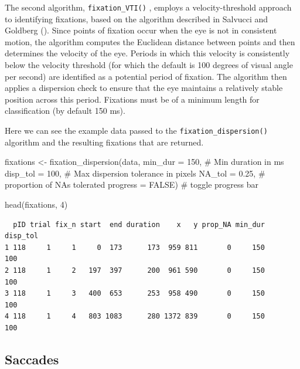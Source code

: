 \documentclass[
  man,
  floatsintext,
  longtable,
  nolmodern,
  notxfonts,
  notimes,
  colorlinks=true,linkcolor=blue,citecolor=blue,urlcolor=blue]{apa7}
\newenvironment{Shaded}{\begin{snugshade}}{\end{snugshade}}
\newcommand{\AttributeTok}[1]{\textcolor[rgb]{0.40,0.45,0.13}{#1}}
\newcommand{\CommentTok}[1]{\textcolor[rgb]{0.37,0.37,0.37}{#1}}
\newcommand{\ConstantTok}[1]{\textcolor[rgb]{0.56,0.35,0.01}{#1}}
\newcommand{\DecValTok}[1]{\textcolor[rgb]{0.68,0.00,0.00}{#1}}
\newcommand{\FloatTok}[1]{\textcolor[rgb]{0.68,0.00,0.00}{#1}}
\newcommand{\FunctionTok}[1]{\textcolor[rgb]{0.28,0.35,0.67}{#1}}
\newcommand{\NormalTok}[1]{\textcolor[rgb]{0.00,0.23,0.31}{#1}}
\newcommand{\OtherTok}[1]{\textcolor[rgb]{0.00,0.23,0.31}{#1}}
\begin{document}
The second algorithm, \texttt{fixation\_VTI()} , employs a
velocity-threshold approach to identifying fixations, based on the
algorithm described in Salvucci and Goldberg
(). Since points of fixation occur when
the eye is not in consistent motion, the algorithm computes the
Euclidean distance between points and then determines the velocity of
the eye. Periods in which this velocity is consistently below the
velocity threshold (for which the default is 100 degrees of visual angle
per second) are identified as a potential period of fixation. The
algorithm then applies a dispersion check to ensure that the eye
maintains a relatively stable position across this period. Fixations
must be of a minimum length for classification (by default 150 ms).

Here we can see the example data passed to the
\texttt{fixation\_dispersion()} algorithm and the resulting fixations
that are returned.

\begin{Shaded}
\begin{Highlighting}[]
\NormalTok{fixations }\OtherTok{\textless{}{-}} 
  \FunctionTok{fixation\_dispersion}\NormalTok{(data,}
                      \AttributeTok{min\_dur =} \DecValTok{150}\NormalTok{, }\CommentTok{\# Min duration in ms}
                      \AttributeTok{disp\_tol =} \DecValTok{100}\NormalTok{, }\CommentTok{\# Max dispersion tolerance in pixels}
                      \AttributeTok{NA\_tol =} \FloatTok{0.25}\NormalTok{, }\CommentTok{\# proportion of NAs tolerated }
                      \AttributeTok{progress =} \ConstantTok{FALSE}\NormalTok{) }\CommentTok{\# toggle progress bar}
                   

\FunctionTok{head}\NormalTok{(fixations, }\DecValTok{4}\NormalTok{)}
\end{Highlighting}
\end{Shaded}

\begin{verbatim}
  pID trial fix_n start  end duration    x   y prop_NA min_dur disp_tol
1 118     1     1     0  173      173  959 811       0     150      100
2 118     1     2   197  397      200  961 590       0     150      100
3 118     1     3   400  653      253  958 490       0     150      100
4 118     1     4   803 1083      280 1372 839       0     150      100
\end{verbatim}

\subsection{Saccades}\label{saccades}
\end{document}
